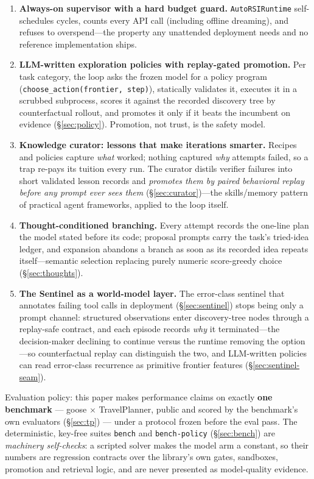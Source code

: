 \documentclass[11pt,a4paper]{article}
\newcommand{\hdr}[1]{\textbf{#1}}
\begin{document}
\begin{enumerate}
  \item \hdr{Always-on supervisor with a hard budget guard.}
  \texttt{AutoRSIRuntime} self-schedules cycles, counts every API call
  (including offline dreaming), and refuses to overspend---the property any
  unattended deployment needs and no reference implementation ships.
  \item \hdr{LLM-written exploration policies with replay-gated promotion.}
  Per task category, the loop asks the frozen model for a policy program
  (\texttt{choose\_action(frontier, step)}), statically validates it, executes
  it in a scrubbed subprocess, scores it against the recorded discovery tree
  by counterfactual rollout, and promotes it only if it beats the incumbent on
  evidence (\S\ref{sec:policy}). Promotion, not trust, is the safety model.
  \item \hdr{Knowledge curator: lessons that make iterations smarter.}
  Recipes and policies capture \emph{what} worked; nothing captured \emph{why}
  attempts failed, so a trap re-pays its tuition every run. The curator
  distils verifier failures into short validated lesson records and
  \emph{promotes them by paired behavioral replay before any prompt ever sees
  them} (\S\ref{sec:curator})---the skills/memory pattern of practical agent
  frameworks, applied to the loop itself.
  \item \hdr{Thought-conditioned branching.}
  Every attempt records the one-line plan the model stated before its code;
  proposal prompts carry the task's tried-idea ledger, and expansion abandons
  a branch as soon as its recorded idea repeats itself---semantic selection
  replacing purely numeric score-greedy choice (\S\ref{sec:thoughts}).
  \item \hdr{The Sentinel as a world-model layer.}
  The error-class sentinel that annotates failing tool calls in deployment
  (\S\ref{sec:sentinel}) stops being only a prompt channel: structured
  observations enter discovery-tree nodes through a replay-safe contract, and
  each episode records \emph{why} it terminated---the decision-maker
  declining to continue versus the runtime removing the option---so
  counterfactual replay can distinguish the two, and LLM-written policies can
  read error-class recurrence as primitive frontier features
  (\S\ref{sec:sentinel-seam}).
\end{enumerate}

Evaluation policy: this paper makes performance claims on exactly
\textbf{one benchmark} --- goose $\times$ TravelPlanner, public and scored by
the benchmark's own evaluators (\S\ref{sec:tp}) --- under a protocol frozen
before the eval pass. The deterministic, key-free suites
\texttt{bench} and \texttt{bench-policy} (\S\ref{sec:bench}) are
\emph{machinery self-checks}: a scripted solver makes the model arm a
constant, so their numbers are regression contracts over the library's own
gates, sandboxes, promotion and retrieval logic, and are never presented as
model-quality evidence.
\end{document}
